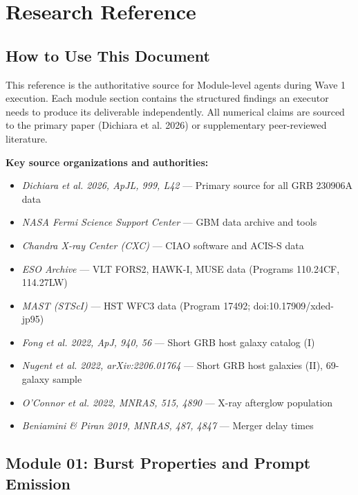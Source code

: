 \documentclass[11pt,letterpaper]{article}
\newcommand{\stageheader}[2]{%
  \noindent\colorbox{#2}{\makebox[\textwidth][l]{%
    \textcolor{white}{\bfseries\sffamily\hspace{6pt}#1\hspace{6pt}}}}%
  \vspace{0.5em}\par%
}
\begin{document}
\newpage
\stageheader{STAGE 2 --- RESEARCH REFERENCE}{secondary}

\section{Research Reference}

\subsection{How to Use This Document}

This reference is the authoritative source for Module-level agents during Wave 1 execution. Each module section contains the structured findings an executor needs to produce its deliverable independently. All numerical claims are sourced to the primary paper (Dichiara et al. 2026) or supplementary peer-reviewed literature.

\textbf{Key source organizations and authorities:}
\begin{itemize}[leftmargin=*]
  \item \textit{Dichiara et al. 2026, ApJL, 999, L42} --- Primary source for all GRB 230906A data
  \item \textit{NASA Fermi Science Support Center} --- GBM data archive and tools
  \item \textit{Chandra X-ray Center (CXC)} --- CIAO software and ACIS-S data
  \item \textit{ESO Archive} --- VLT FORS2, HAWK-I, MUSE data (Programs 110.24CF, 114.27LW)
  \item \textit{MAST (STScI)} --- HST WFC3 data (Program 17492; doi:10.17909/xded-jp95)
  \item \textit{Fong et al. 2022, ApJ, 940, 56} --- Short GRB host galaxy catalog (I)
  \item \textit{Nugent et al. 2022, arXiv:2206.01764} --- Short GRB host galaxies (II), 69-galaxy sample
  \item \textit{O'Connor et al. 2022, MNRAS, 515, 4890} --- X-ray afterglow population
  \item \textit{Beniamini \& Piran 2019, MNRAS, 487, 4847} --- Merger delay times
\end{itemize}

\subsection{Module 01: Burst Properties and Prompt Emission}
\end{document}
